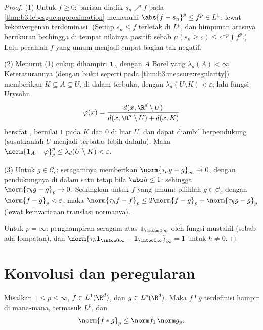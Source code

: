 \begin{proof}
(1) Untuk $f \geq 0$: barisan diadik $s_n \nearrow f$ pada
\cref{thm:b3:lebesgue:approximation} memenuhi $\abs{f - s_n}^p
\leq f^p \in L^1$: lewat kekonvergenan terdominasi. (Setiap $s_n \leq f$ terletak di $L^p$, dan
himpunan arasnya berukuran berhingga di tempat nilainya
positif: sebab $\mu(s_n \geq c) \leq c^{-p}\int f^p$.) Lalu pecahlah
$f$ yang umum menjadi empat bagian tak negatif.

(2) Menurut (1) cukup dihampiri $\mathbf 1_A$ dengan $A$ Borel
yang $\lambda_d(A) < \infty$. Keteraturannya (dengan bukti seperti pada
\cref{thm:b3:measure:regularity}) memberikan $K \subseteq A
\subseteq U$,  di dalam terbuka, dengan $\lambda_d(U\setminus K) <
\varepsilon$; lalu fungsi Urysohn
\[
\varphi(x) = \frac{d(x, \R^d\setminus U)}{d(x, \R^d\setminus U)
+ d(x, K)}
\]
bersifat , bernilai $1$ pada $K$ dan $0$ di luar $U$, dan dapat diambil
berpendukung  (susutkanlah $U$ menjadi  terbatas lebih dahulu). Maka
$\norm{\mathbf 1_A - \varphi}_p^p \leq \lambda_d(U\setminus K)
< \varepsilon$.

(3) Untuk $g \in \mathcal C_c$:  seragamnya memberikan
$\norm{\tau_hg - g}_\infty \to 0$, dengan pendukungnya di dalam satu
 tetap bila $\abs h \leq 1$: sehingga $\norm{\tau_hg - g}_p \to 0$. Sedangkan untuk
$f$ yang umum: pilihlah $g \in \mathcal C_c$ dengan $\norm{f - g}_p <
\varepsilon$; maka $\norm{\tau_hf - f}_p \leq 2\norm{f - g}_p +
\norm{\tau_hg - g}_p$ (lewat keinvarianan translasi normanya).

Untuk $p = \infty$: penghampiran seragam atas $\mathbf
1_{\intoo0\infty}$ oleh fungsi  mustahil
(sebab ada lompatan), dan $\norm{\tau_h\mathbf 1_{\intoo0\infty} - \mathbf
1_{\intoo0\infty}}_\infty = 1$ untuk $h \neq 0$.
\end{proof}

\section{Konvolusi dan peregularan}

\begin{theorem}\label{thm:b3:lp:young}
Misalkan $1 \leq p \leq \infty$, $f \in L^1(\R^d)$, dan $g \in
L^p(\R^d)$. Maka $f * g$ terdefinisi hampir di mana-mana, termasuk $L^p$,
dan
\[
\norm{f * g}_p \leq \norm f_1\,\norm g_p .
\]
\end{theorem}

